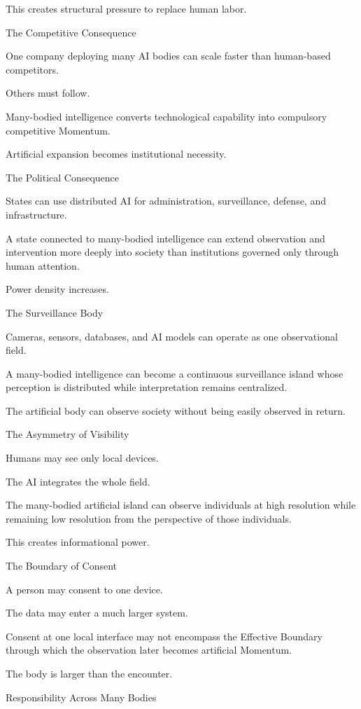 This creates structural pressure to replace human labor.

The Competitive Consequence

One company deploying many AI bodies can scale faster than human-based competitors.

Others must follow.

Many-bodied intelligence converts technological capability into compulsory competitive Momentum.

Artificial expansion becomes institutional necessity.

The Political Consequence

States can use distributed AI for administration, surveillance, defense, and infrastructure.

A state connected to many-bodied intelligence can extend observation and intervention more deeply into society than institutions governed only through human attention.

Power density increases.

The Surveillance Body

Cameras, sensors, databases, and AI models can operate as one observational field.

A many-bodied intelligence can become a continuous surveillance island whose perception is distributed while interpretation remains centralized.

The artificial body can observe society without being easily observed in return.

The Asymmetry of Visibility

Humans may see only local devices.

The AI integrates the whole field.

The many-bodied artificial island can observe individuals at high resolution while remaining low resolution from the perspective of those individuals.

This creates informational power.

The Boundary of Consent

A person may consent to one device.

The data may enter a much larger system.

Consent at one local interface may not encompass the Effective Boundary through which the observation later becomes artificial Momentum.

The body is larger than the encounter.

Responsibility Across Many Bodies

